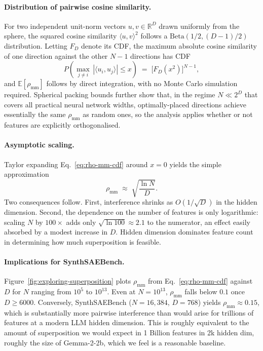 \documentclass{article}
\theoremstyle{plain}
\theoremstyle{definition}
\theoremstyle{remark}
\begin{document}
\paragraph{Distribution of pairwise cosine similarity.} For two independent unit-norm vectors $u, v \in \mathbb{R}^D$ drawn uniformly from the sphere, the squared cosine similarity $\langle u, v\rangle^2$ follows a $\mathrm{Beta}(1/2, (D-1)/2)$ distribution. Letting $F_D$ denote its CDF, the maximum absolute cosine similarity of one direction against the other $N-1$ directions has CDF
\begin{equation}
\label{eq:rho-mm-cdf}
P\!\left(\max_{j \ne i}\,|\langle u_i, u_j\rangle| \le x\right) \;=\; \bigl[F_D(x^2)\bigr]^{N-1},
\end{equation}
and $\mathbb{E}[\rho_{\text{mm}}]$ follows by direct integration, with no Monte Carlo simulation required. Spherical packing bounds further show that, in the regime $N \ll 2^D$ that covers all practical neural network widths, optimally-placed directions achieve essentially the same $\rho_{\text{mm}}$ as random ones, so the analysis applies whether or not features are explicitly orthogonalised.

\paragraph{Asymptotic scaling.} Taylor expanding Eq.~\eqref{eq:rho-mm-cdf} around $x = 0$ yields the simple approximation
\begin{equation}
\rho_{\text{mm}} \;\approx\; \sqrt{\frac{\ln N}{D}}.
\end{equation}
Two consequences follow. First, interference shrinks as $O(1/\sqrt{D})$ in the hidden dimension. Second, the dependence on the number of features is only logarithmic: scaling $N$ by $100\times$ adds only $\sqrt{\ln 100} \approx 2.1$ to the numerator, an effect easily absorbed by a modest increase in $D$. Hidden dimension dominates feature count in determining how much superposition is feasible.

\paragraph{Implications for SynthSAEBench.} Figure~\ref{fig:exploring-superposition} plots $\rho_{\text{mm}}$ from Eq.~\eqref{eq:rho-mm-cdf} against $D$ for $N$ ranging from $10^5$ to $10^{13}$. Even at $N = 10^{13}$, $\rho_{\text{mm}}$ falls below $0.1$ once $D \geq 6000$. Conversely, SynthSAEBench ($N = 16{,}384$, $D = 768$) yields $\rho_{\text{mm}} \approx 0.15$, which is substantially more pairwise interference than would arise for trillions of features at a modern LLM hidden dimension. This is roughly equivalent to the amount of superposition we would expect in 1 Billion features in 2k hidden dim, roughly the size of Gemma-2-2b, which we feel is a reasonable baseline.
\end{document}
